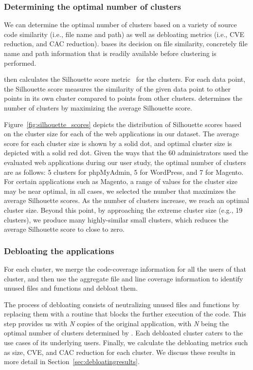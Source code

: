\subsubsection{Determining the optimal number of clusters} 
\label{sec:num-clusters}

We can determine the optimal number of clusters based on a variety of source code similarity (i.e., file name and path) as well as debloating metrics (i.e., CVE reduction, and CAC reduction). 
\sys{} bases its decision on file similarity, concretely file name and path information that is readily available before clustering is performed. 

\sys{} then calculates the Silhouette score metric~\cite{kaufman2009finding} for the clusters. 
For each data point, the Silhouette score measures the similarity of the given data point to other points in its own cluster compared to points from other clusters. 
\sys{} determines the number of clusters by maximizing the average Silhouette score. 

Figure~\ref{fig:silhouette_scores} depicts the distribution of Silhouette scores based on the cluster size for each of the web applications in our dataset. 
The average score for each cluster size is shown by a solid dot, and optimal cluster size is depicted with a solid red dot. 
Given the ways that the 60 administrators used the evaluated web applications during our user study, the optimal number of clusters are as follows: 5 clusters for phpMyAdmin, 5 for WordPress, and 7 for Magento. 
For certain applications such as Magento, a range of values for the cluster size may be near optimal, in all cases, we selected the number that maximizes the average Silhouette scores.
As the number of clusters increase, we reach an optimal cluster size. 
Beyond this point, by approaching the extreme cluster size (e.g., 19 clusters), we produce many highly-similar small clusters, which reduces the average Silhouette score to close to zero. 

\subsubsection{Debloating the applications} For each cluster, we merge the code-coverage information for all the users of that cluster, and then use the aggregate file and line coverage information to identify unused files and functions and debloat them. 

The process of debloating consists of neutralizing unused files and functions by replacing them with a routine that blocks the further execution of the code. 
This step provides us with \emph{N} copies of the original application, with \emph{N} being the optimal number of clusters determined by \sys{}. 
Each debloated cluster caters to the use cases of its underlying users. 
Finally, we calculate the debloating metrics such as size, CVE, and CAC reduction for each cluster. 
We discuss these results in more detail in Section~\ref{sec:debloatingresults}.

